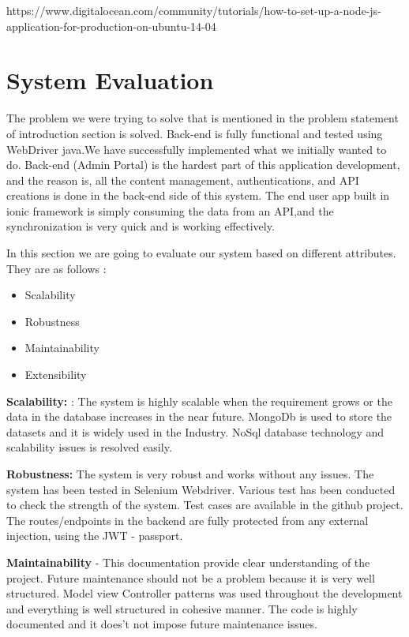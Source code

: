 	https://www.digitalocean.com/community/tutorials/how-to-set-up-a-node-js-application-for-production-on-ubuntu-14-04


\chapter{System Evaluation}

	The problem we were trying to solve that is mentioned in the problem statement of introduction section is solved. Back-end is fully functional and tested using WebDriver java.We have successfully implemented what we initially wanted to do. Back-end (Admin Portal) is the hardest part of this application development, and the reason is, all the content management, authentications, and API creations is done in the back-end side of this system. The end user app built in ionic framework  is simply consuming the data from an API,and the synchronization is very quick and is working effectively. 
	
	In this section we are going to evaluate our system based on different attributes. They are as follows : 
	\begin{itemize}
	\item	Scalability
	\item	Robustness
	\item	Maintainability
	\item	Extensibility 
	\end{itemize}
	
    \textbf{Scalability: } :  The system is highly scalable when the requirement grows or the data in the database increases in the near future. MongoDb is used to store the datasets and it is widely used in the Industry. NoSql database technology and scalability issues is resolved easily. 
    
     \textbf{Robustness: } The system is very robust and works without any issues.
     The system has been tested in Selenium Webdriver. Various test has been conducted to check the strength of the system. Test cases are available in the github project. The routes/endpoints in the backend are fully protected from any external injection, using the JWT - passport. 
     
     
    \textbf{Maintainability} - This documentation provide clear understanding of the project. Future maintenance should not be a problem because it is very well structured. Model view Controller patterns was used throughout the development and everything is well structured in cohesive manner. The code is highly documented and it does't not impose future maintenance issues.
    
